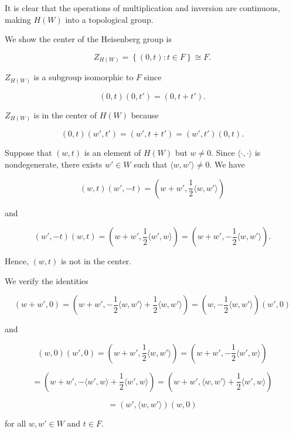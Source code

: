 \documentclass[12pt]{article}
\begin{document}
It is clear that the operations of multiplication and inversion are continuous,
making $H\left(W\right)$ into a topological group.

We show the center of the Heisenberg group is 

\[Z_{H\left(W\right)} = \left\{\left(0, t\right) : t \in F\right\} \cong F.\]

$Z_{H\left(W\right)}$ is a subgroup isomorphic to $F$ since 

\[\left(0, t\right) \left(0, t'\right) = \left(0, t + t'\right).\]

$Z_{H\left(W\right)}$ is in the center of $H\left(W\right)$ because 

\[\left(0, t\right) \left(w', t'\right) = \left(w', t + t'\right) = \left(w',
t'\right) \left(0, t\right).\]

Suppose that $\left(w, t\right)$ is an element of $H\left(W\right)$ but $w \neq
0$. Since $\langle \cdot, \cdot \rangle$ is nondegenerate, there exists $w' \in
W$ such that $\langle w, w' \rangle \neq 0$. We have 

\[\left(w, t\right) \left(w', -t\right) = \left(w + w', \frac{1}{2} \langle w,
w' \rangle\right)\]

and 

\[\left(w', -t\right) \left(w, t\right) = \left(w + w', \frac{1}{2} \langle w',
w \rangle\right) = \left(w + w', - \frac{1}{2}\langle w, w' \rangle\right).\]

Hence, $\left(w, t\right)$ is not in the center.

We verify the identities

\[\left(w + w', 0\right) = \left(w + w', - \frac{1}{2} \langle w, w' \rangle +
\frac{1}{2} \langle w, w' \rangle\right) = \left(w, -\frac{1}{2}\langle w, w'
\rangle\right)\left(w', 0\right)\] 

and

\[\left(w, 0\right)\left(w', 0\right) = \left(w + w', \frac{1}{2} \langle w, w'
\rangle\right) = \left(w + w', -\frac{1}{2}\langle w', w\rangle\right)\] 

\[= \left(w + w', -\langle w', w \rangle + \frac{1}{2}\langle w', w
\rangle\right) = \left(w + w', \langle w, w' \rangle + \frac{1}{2}\langle w', w
\rangle \right)\]

\[= \left(w', \langle w, w' \rangle\right)\left(w, 0\right)\]

for all $w, w' \in W$ and $t \in F$.
\end{document}
